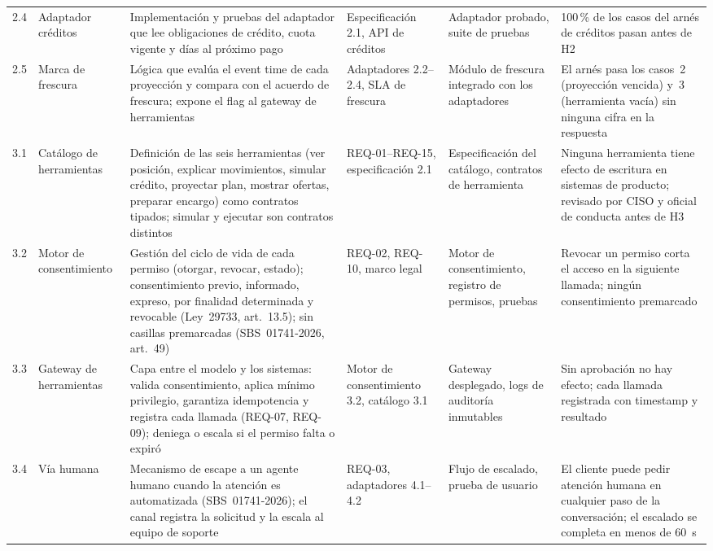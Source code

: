 \documentclass[11pt]{article}
\begin{document}
\begin{longtable}{@{}p{0.7cm} p{2.1cm} p{3.3cm} p{2.3cm} p{2.3cm} p{2.9cm}@{}}
2.4 & Adaptador créditos & Implementación y pruebas del adaptador que lee obligaciones de crédito, cuota vigente y días al próximo pago & Especificación 2.1, API de créditos & Adaptador probado, suite de pruebas & 100\,\% de los casos del arnés de créditos pasan antes de H2 \\[0.3em]
2.5 & Marca de frescura & Lógica que evalúa el event time de cada proyección y compara con el acuerdo de frescura; expone el flag al gateway de herramientas & Adaptadores 2.2–2.4, SLA de frescura & Módulo de frescura integrado con los adaptadores & El arnés pasa los casos~2 (proyección vencida) y~3 (herramienta vacía) sin ninguna cifra en la respuesta \\[0.5em]
\midrule
3.1 & Catálogo de herramientas & Definición de las seis herramientas (ver posición, explicar movimientos, simular crédito, proyectar plan, mostrar ofertas, preparar encargo) como contratos tipados; simular y ejecutar son contratos distintos & REQ-01–REQ-15, especificación 2.1 & Especificación del catálogo, contratos de herramienta & Ninguna herramienta tiene efecto de escritura en sistemas de producto; revisado por CISO y oficial de conducta antes de H3 \\[0.3em]
3.2 & Motor de consentimiento & Gestión del ciclo de vida de cada permiso (otorgar, revocar, estado); consentimiento previo, informado, expreso, por finalidad determinada y revocable (Ley~29733, art.~13.5); sin casillas premarcadas (SBS~01741-2026, art.~49) & REQ-02, REQ-10, marco legal & Motor de consentimiento, registro de permisos, pruebas & Revocar un permiso corta el acceso en la siguiente llamada; ningún consentimiento premarcado \\[0.3em]
3.3 & Gateway de herramientas & Capa entre el modelo y los sistemas: valida consentimiento, aplica mínimo privilegio, garantiza idempotencia y registra cada llamada (REQ-07, REQ-09); deniega o escala si el permiso falta o expiró & Motor de consentimiento 3.2, catálogo 3.1 & Gateway desplegado, logs de auditoría inmutables & Sin aprobación no hay efecto; cada llamada registrada con timestamp y resultado \\[0.3em]
3.4 & Vía humana & Mecanismo de escape a un agente humano cuando la atención es automatizada (SBS~01741-2026); el canal registra la solicitud y la escala al equipo de soporte & REQ-03, adaptadores 4.1–4.2 & Flujo de escalado, prueba de usuario & El cliente puede pedir atención humana en cualquier paso de la conversación; el escalado se completa en menos de 60~s \\[0.5em]

\end{longtable}
\end{document}
